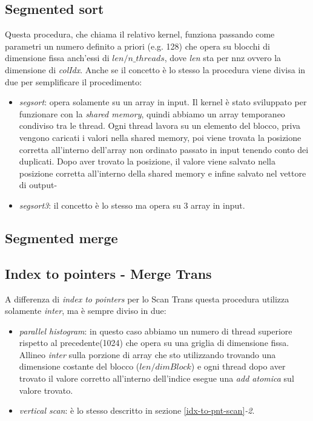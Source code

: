 \documentclass[]{IEEEtran}
\begin{document}
	\subsection{Segmented sort}
	\label{seg-sort}
	Questa procedura, che chiama il relativo kernel, funziona passando come parametri un numero definito a priori (e.g. 128) che opera su blocchi di dimensione fissa anch'essi di $ len/n\_threads $, dove \textit{len} sta per nnz ovvero la dimensione di \textit{colIdx}.\newline
	Anche se il concetto è lo stesso la procedura viene divisa in due per semplificare il procedimento:
	\begin{itemize}
		\item \textit{segsort}: opera solamente su un array in input. Il kernel è stato sviluppato per funzionare con la \textit{shared memory}, quindi abbiamo un array temporaneo condiviso tra le thread. Ogni thread lavora su un elemento del blocco, priva vengono caricati i valori nella shared memory, poi viene trovata la posizione corretta all'interno dell'array non ordinato passato in input tenendo conto dei duplicati. Dopo aver trovato la posizione, il valore viene salvato nella posizione corretta all'interno della shared memory e infine salvato nel vettore di output-
		\item \textit{segsort3}: il concetto è lo stesso ma opera su 3 array in input.
	\end{itemize}
	
	\subsection{Segmented merge}
	\label{seg-merge}

	\subsection{Index to pointers - Merge Trans}
	\label{idx-to-pnt-merge}
	A differenza di \textit{index to pointers} per lo Scan Trans questa procedura utilizza solamente \textit{inter}, ma è sempre diviso in due:
	\begin{itemize}
		\item \textit{parallel histogram}: in questo caso abbiamo un numero di thread superiore rispetto al precedente(1024) che opera su una griglia di dimensione fissa. Allineo \textit{inter} sulla porzione di array che sto utilizzando trovando una dimensione costante del blocco ($ len/dimBlock $) e ogni thread dopo aver trovato il valore corretto all'interno dell'indice esegue una \textit{add atomica} sul valore trovato.
		\item \textit{vertical scan}: è lo stesso descritto in sezione \ref{idx-to-pnt-scan}\textit{-2}.
	\end{itemize}
	
\end{document}
